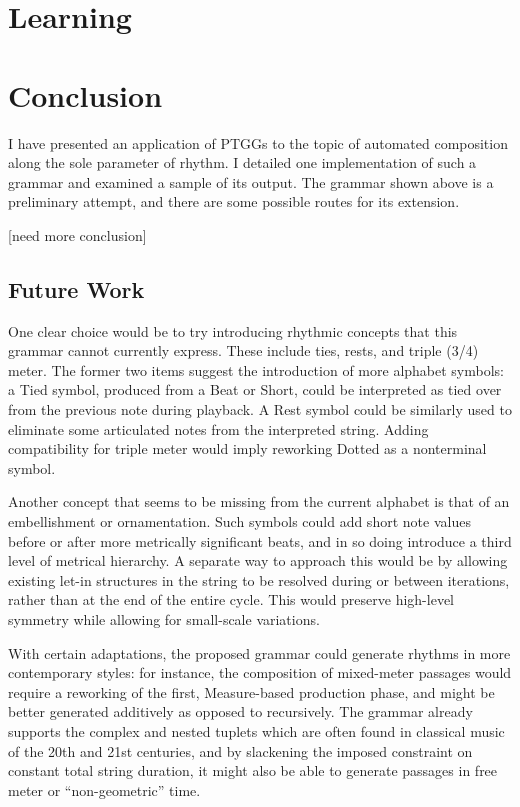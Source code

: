 \documentclass{article}
\begin{document}
\section{Learning}


\section{Conclusion}

I have presented an application of PTGGs to the topic of automated composition along the sole parameter of rhythm. I detailed one implementation of such a grammar and examined a sample of its output. The grammar shown above is a preliminary attempt, and there are some possible routes for its extension. 

[need more conclusion]

\subsection{Future Work}

One clear choice would be to try introducing rhythmic concepts that this grammar cannot currently express. These include ties, rests, and triple (3/4) meter. The former two items suggest the introduction of more alphabet symbols: a Tied symbol, produced from a Beat or Short, could be interpreted as tied over from the previous note during playback. A Rest symbol could be similarly used to eliminate some articulated notes from the interpreted string. Adding compatibility for triple meter would imply reworking Dotted as a nonterminal symbol.

Another concept that seems to be missing from the current alphabet is that of an embellishment or ornamentation. Such symbols could add short note values before or after more metrically significant beats, and in so doing introduce a third level of metrical hierarchy. A separate way to approach this would be by allowing existing let-in structures in the string to be resolved during or between iterations, rather than at the end of the entire cycle. This would preserve high-level symmetry while allowing for small-scale variations.

With certain adaptations, the proposed grammar could generate rhythms in more contemporary styles: for instance, the composition of mixed-meter passages would require a reworking of the first, Measure-based production phase, and might be better generated additively as opposed to recursively. The grammar already supports the complex and nested tuplets which are often found in classical music of the 20th and 21st centuries, and by slackening the imposed constraint on constant total string duration, it might also be able to generate passages in free meter or “non-geometric” time.
\end{document}
